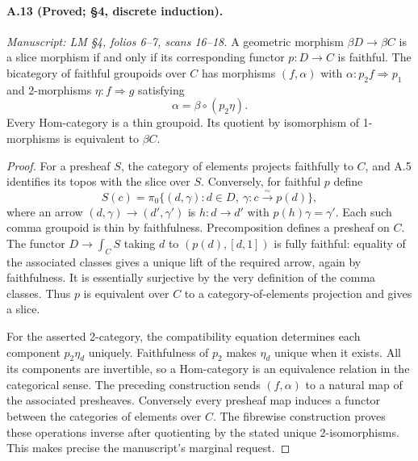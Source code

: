 \paragraph{A.13 (Proved; \S4, discrete induction).}
\textit{Manuscript: LM \S4, folios 6--7, scans 16--18.}
A geometric morphism $\beta D\to\beta C$ is a slice morphism if and only if its corresponding functor $p:D\to C$ is faithful. The bicategory of faithful groupoids over $C$ has morphisms $(f,\alpha)$ with $\alpha:p_2f\Rightarrow p_1$ and 2-morphisms $\eta:f\Rightarrow g$ satisfying
\[
 \alpha=\beta\circ(p_2\eta).
\]
Every Hom-category is a thin groupoid. Its quotient by isomorphism of 1-morphisms is equivalent to $\beta C$.
\begin{proof}
For a presheaf $S$, the category of elements projects faithfully to $C$, and A.5 identifies its topos with the slice over $S$. Conversely, for faithful $p$ define
\[
 S(c)=\pi_0\{(d,\gamma):d\in D,\ \gamma:c\xrightarrow{\sim}p(d)\},
\]
where an arrow $(d,\gamma)\to(d',\gamma')$ is $h:d\to d'$ with $p(h)\gamma=\gamma'$. Each such comma groupoid is thin by faithfulness. Precomposition defines a presheaf on $C$. The functor $D\to\int_C S$ taking $d$ to $(p(d),[d,1])$ is fully faithful: equality of the associated classes gives a unique lift of the required arrow, again by faithfulness. It is essentially surjective by the very definition of the comma classes. Thus $p$ is equivalent over $C$ to a category-of-elements projection and gives a slice.

For the asserted 2-category, the compatibility equation determines each component $p_2\eta_d$ uniquely. Faithfulness of $p_2$ makes $\eta_d$ unique when it exists. All its components are invertible, so a Hom-category is an equivalence relation in the categorical sense. The preceding construction sends $(f,\alpha)$ to a natural map of the associated presheaves. Conversely every presheaf map induces a functor between the categories of elements over $C$. The fibrewise construction proves these operations inverse after quotienting by the stated unique 2-isomorphisms. This makes precise the manuscript's marginal request. 
\end{proof}

